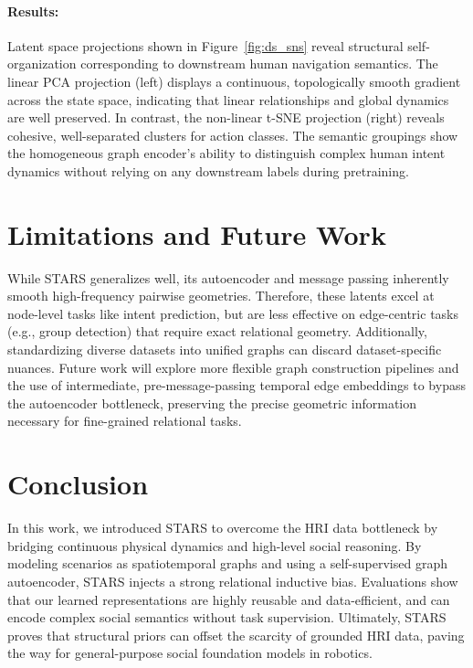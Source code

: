 \documentclass{article}
\newcommand{\method}{STARS\xspace}
\begin{document}
\paragraph{Results:}
Latent space projections shown in Figure~\ref{fig:ds_sns} reveal structural self-organization corresponding to downstream human navigation semantics. 
The linear PCA projection (left) displays a continuous, topologically smooth gradient across the state space, indicating that linear relationships and global dynamics are well preserved. 
In contrast, the non-linear t-SNE projection (right) reveals cohesive, well-separated clusters for action classes.
The semantic groupings show the homogeneous graph encoder's ability to distinguish complex human intent dynamics without relying on any downstream labels during pretraining.



\section{Limitations and Future Work}
\label{sec:limitations}
While \method generalizes well, its autoencoder and message passing inherently smooth high-frequency pairwise geometries.
Therefore, these latents excel at node-level tasks like intent prediction, but are less effective on edge-centric tasks (e.g., group detection) that require exact relational geometry.
Additionally, standardizing diverse datasets into unified graphs can discard dataset-specific nuances.
Future work will explore more flexible graph construction pipelines and the use of intermediate, pre-message-passing temporal edge embeddings to bypass the autoencoder bottleneck, preserving the precise geometric information necessary for fine-grained relational tasks.

\section{Conclusion}
\label{sec:conclusion}
In this work, we introduced \method to overcome the HRI data bottleneck by bridging continuous physical dynamics and high-level social reasoning.
By modeling scenarios as spatiotemporal graphs and using a self-supervised graph autoencoder, \method injects a strong relational inductive bias. 
Evaluations show that our learned representations are highly reusable and data-efficient, and can encode complex social semantics without task supervision.
Ultimately, \method proves that structural priors can offset the scarcity of grounded HRI data, paving the way for general-purpose social foundation models in robotics.


\acknowledgments{}

\clearpage


\end{document}
